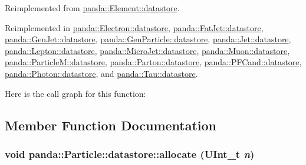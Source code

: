 Reimplemented from \hyperlink{structpanda_1_1Element_1_1datastore_a14bdbf5fcb0c5553c70d43de0cffd090}{panda::Element::datastore}.

Reimplemented in \hyperlink{structpanda_1_1Electron_1_1datastore_af9dfc2f8a0fca924c40cc0d488f6bb02}{panda::Electron::datastore}, \hyperlink{structpanda_1_1FatJet_1_1datastore_ab30c9e78310606976935325a55cb10e6}{panda::FatJet::datastore}, \hyperlink{structpanda_1_1GenJet_1_1datastore_aee5add4c9f162350865cec47c322dec0}{panda::GenJet::datastore}, \hyperlink{structpanda_1_1GenParticle_1_1datastore_af04b1b2c05d433c8020d5250db10d7d9}{panda::GenParticle::datastore}, \hyperlink{structpanda_1_1Jet_1_1datastore_a70fb643b535f39f676287fe34d603e01}{panda::Jet::datastore}, \hyperlink{structpanda_1_1Lepton_1_1datastore_aded63fdccd7551ae16f99adbd29afb82}{panda::Lepton::datastore}, \hyperlink{structpanda_1_1MicroJet_1_1datastore_a35979d6037e5229b018a32e3d0700360}{panda::MicroJet::datastore}, \hyperlink{structpanda_1_1Muon_1_1datastore_a399cd7ed5610fc6c99ac1d3365ddc354}{panda::Muon::datastore}, \hyperlink{structpanda_1_1ParticleM_1_1datastore_ae068980c20730bc8565d2f7ea701bc5e}{panda::ParticleM::datastore}, \hyperlink{structpanda_1_1Parton_1_1datastore_aa1e55feb33f97040c324d9ba93126dba}{panda::Parton::datastore}, \hyperlink{structpanda_1_1PFCand_1_1datastore_af62f03093f0dd1177468df953265e198}{panda::PFCand::datastore}, \hyperlink{structpanda_1_1Photon_1_1datastore_a7282a7c7cc04a9350041a59e9ecba5b5}{panda::Photon::datastore}, and \hyperlink{structpanda_1_1Tau_1_1datastore_a1cacb9f88f221d242a5e80ba7959c27b}{panda::Tau::datastore}.

Here is the call graph for this function:

\subsection{Member Function Documentation}
\hypertarget{structpanda_1_1Particle_1_1datastore_aab4009a97b5f3cc30eaf61cd7dbf2e3d}{
\subsubsection[{allocate}]{\setlength{\rightskip}{0pt plus 5cm}void panda::Particle::datastore::allocate (UInt\_\-t {\em n})}}
\label{structpanda_1_1Particle_1_1datastore_aab4009a97b5f3cc30eaf61cd7dbf2e3d}


